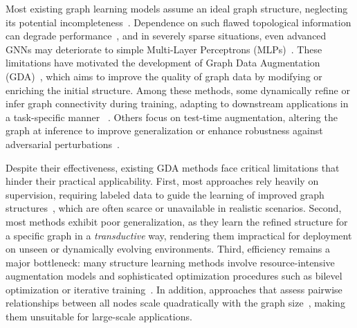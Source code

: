\documentclass[letterpaper]{article} \usepackage{aaai2026}  \usepackage{times}  \usepackage{helvet}  \usepackage{courier}  \usepackage[hyphens]{url}  \usepackage{graphicx} \urlstyle{rm} \def\UrlFont{\rm}  \usepackage{natbib}  \usepackage{caption} \frenchspacing  \setlength{\pdfpagewidth}{8.5in}  \setlength{\pdfpageheight}{11in}
\begin{document}
Most existing graph learning models assume an ideal graph structure, neglecting its potential incompleteness~\cite{kipf2016semi, hou2022graphmae, yun2019graph}.
Dependence on such flawed topological information can degrade performance~\cite{li2023gslb}, and in severely sparse situations, even advanced GNNs may deteriorate to simple Multi-Layer Perceptrons (MLPs)~\cite{zheng2021cold}.
These limitations have motivated the development of Graph Data Augmentation (GDA)~\cite{ding2022data}, which aims to improve the quality of graph data by modifying or enriching the initial structure. Among these methods, some dynamically refine or infer graph connectivity during training, adapting to downstream applications in a task-specific manner ~\cite{fatemi2021slaps, franceschi2019learning, chen2020iterative, yu2021graph}. Others focus on test-time augmentation, altering the graph at inference to improve generalization or enhance robustness against adversarial perturbations~\cite{jin2022empowering, ju2023graphpatcher}.

Despite their effectiveness, existing GDA methods face critical limitations that hinder their practical applicability. First, most approaches rely heavily on supervision, requiring labeled data to guide the learning of improved graph structures~\cite{franceschi2019learning, chen2020iterative, jin2020graph, yu2021graph, fatemi2021slaps, ju2023graphpatcher, zhao2023graphglow}, which are often scarce or unavailable in realistic scenarios. Second, most methods exhibit poor generalization, as they learn the refined structure for a specific graph in a \textit{transductive} way, rendering them impractical for deployment on unseen or  dynamically evolving environments.
Third, efficiency remains a major bottleneck: many structure learning methods involve resource-intensive augmentation models and sophisticated optimization procedures such as bilevel optimization or iterative training~\cite{franceschi2019learning, chen2020iterative}. In addition, approaches that assess pairwise relationships between all nodes scale quadratically with the graph size~\cite{franceschi2019learning, liu2022towards, jin2022empowering}, making them unsuitable for large-scale applications.
\end{document}
